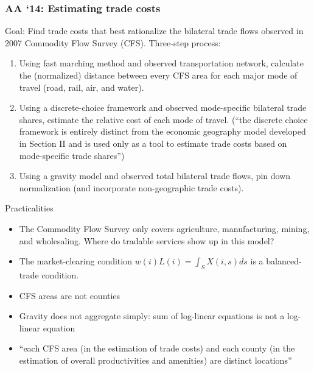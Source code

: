\documentclass[11pt,notes=hide,aspectratio=169]{beamer}
\begin{document}
\begin{frame}
\frametitle{AA `14: Estimating trade costs}
Goal: Find trade costs that best rationalize the bilateral trade flows observed in 2007 Commodity Flow Survey (CFS).
Three-step process:
\begin{enumerate}
\item Using fast marching method and observed transportation network, calculate the (normalized) distance between every CFS area for each major mode of travel (road, rail, air, and water).
\item Using a discrete-choice framework and observed mode-specific bilateral trade shares, estimate the relative cost of each mode of travel.
(``the discrete choice framework is entirely distinct from the economic geography model developed in Section II and is used only as a tool to estimate trade costs based on mode-specific trade shares'')
\item Using a gravity model and observed total bilateral trade flows, pin down normalization (and incorporate non-geographic trade costs).
\end{enumerate}
\end{frame}
\begin{frame}{Practicalities}
\begin{itemize}
\item The Commodity Flow Survey only covers agriculture, manufacturing, mining, and wholesaling.
Where do tradable services show up in this model?
\item The market-clearing condition $w\left(i\right)L\left(i\right)=\int_{S}X\left(i,s\right)ds$ is a balanced-trade condition.
\item CFS areas are not counties
\item Gravity does not aggregate simply: sum of log-linear equations is not a log-linear equation
\item ``each CFS area (in the estimation of trade costs) and each county (in the estimation of overall productivities and amenities) are distinct locations''
\end{itemize}
\end{frame}
\end{document}
